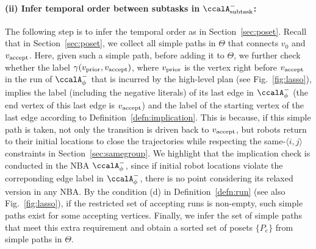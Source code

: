\documentclass[Afour,sageh,times]{sagej}
\newcommand{\auto}[1]{\ccalA_{\textup{#1}}}
\newcommand{\autop}{\ccalA_{\phi}}
\newcommand{\vertex}[1]{v_{\textup{#1}}}
\newcommand{\ag}[2]{\langle#1,#2\rangle}
\begin{document}
{{  \paragraph{(ii) Infer temporal order between subtasks in $\auto{subtask}^-$:}The following step is to infer the temporal order as in Section~\ref{sec:poset}. Recall that in Section~\ref{sec:poset}, we collect all simple paths in $\Theta$ that connects $v_0$ and $\vertex{accept}$. Here, given such a simple path, before adding it to $\Theta$, we further check whether the label $\gamma(\vertex{prior}, \vertex{accept})$, where $\vertex{prior}$ is the vertex right before $\vertex{accept}$ in the run of $\autop^-$ that is incurred by the high-level plan (see Fig.~\ref{fig:lasso}), implies the label (including the negative literals) of its last edge in $\autop^-$ (the end vertex of this last edge is $\vertex{accept}$) and the label of the starting vertex of the last edge  according to Definition~\ref{defn:implication}. This is because, if this simple path is taken, not only the transition is driven back to $\vertex{accept}$, but robots return to their initial locations to close the trajectories while respecting the same-$\ag{i}{j}$ constraints in Section~\ref{sec:samegroup}. We highlight that the implication check is conducted in the NBA $\autop^-$, since if initial robot locations violate the correponding  edge label in $\autop^-$, there is no point considering its relaxed version in any NBA. By the condition (d) in Definition~\ref{defn:run} (see also Fig.~\ref{fig:lasso}), if the restricted set of accepting runs is non-empty, such simple paths exist for some accepting vertices. Finally, we infer the set of simple paths that meet this extra requirement and  obtain a sorted set of posets $\{P_e\}$ from simple paths in $\Theta$.

}}
\end{document}
